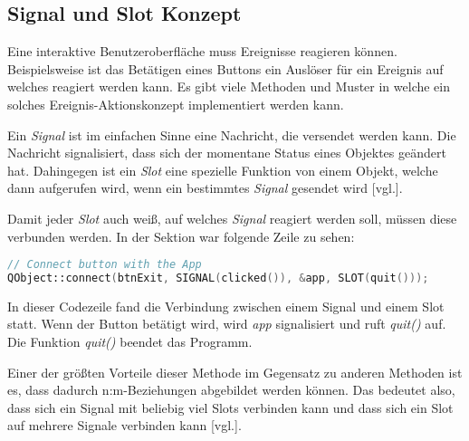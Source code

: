 \subsection{Signal und Slot Konzept}
\label{subsec:signalslot}
Eine interaktive Benutzeroberfläche muss
Ereignisse reagieren können. Beispielsweise ist das Betätigen eines Buttons ein Auslöser für ein
Ereignis auf welches reagiert werden kann. Es gibt viele Methoden und Muster in welche ein
solches Ereignis-Aktionskonzept implementiert werden kann.

Ein \emph{Signal} ist im einfachen Sinne eine Nachricht, die versendet werden kann. Die Nachricht
signalisiert, dass sich der momentane Status eines Objektes geändert hat. Dahingegen ist ein
\emph{Slot} eine spezielle Funktion von einem Objekt, welche dann aufgerufen wird, wenn ein
bestimmtes \emph{Signal} gesendet wird \cite{GettingStartedQt}[vgl.].

Damit jeder \emph{Slot} auch weiß, auf welches \emph{Signal} reagiert werden soll, müssen diese verbunden werden. In der Sektion \emph{} war
folgende Zeile zu sehen:

\begin{lstlisting}[language=C++, caption=Signal- und Slot-Beispiel, label=lst:SignalSlotBeispiel]
// Connect button with the App
QObject::connect(btnExit, SIGNAL(clicked()), &app, SLOT(quit()));

\end{lstlisting}

In dieser Codezeile fand die Verbindung zwischen einem Signal und einem Slot statt.
Wenn der Button betätigt wird, wird \emph{app} signalisiert und ruft \emph{quit()} auf. Die
Funktion \emph{quit()} beendet das Programm.

Einer der größten Vorteile dieser Methode im Gegensatz zu anderen Methoden ist es, dass dadurch
n:m-Beziehungen abgebildet werden können. Das bedeutet also, dass sich ein Signal mit
beliebig viel Slots verbinden kann und dass sich ein Slot auf mehrere Signale verbinden kann
\cite{SignalSlotMechanismus}[vgl.].